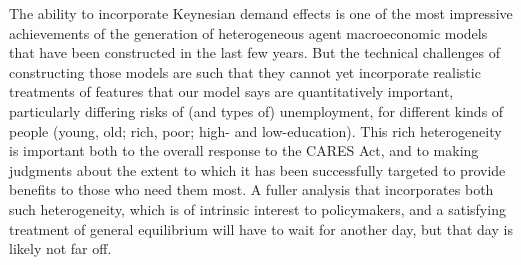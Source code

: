 \documentclass[titlepage,a4paper]{\econtex}
\providecommand{\texname}{ConsumptionResponse}%
\begin{document}
The ability to incorporate Keynesian demand effects is one of the most impressive achievements of the generation of heterogeneous agent macroeconomic models that have been constructed in the last few years.
But the technical challenges of constructing those models are such that they cannot yet incorporate realistic treatments of features that our model says are quantitatively important, particularly differing risks of (and types of) unemployment, for different kinds of people (young, old; rich, poor; high- and low-education).
This rich heterogeneity is important both to the overall response to the CARES Act, and to making judgments about the extent to which it has been successfully targeted to provide benefits to those who need them most.
A fuller analysis that incorporates both such heterogeneity, which is of intrinsic interest to policymakers, and a satisfying treatment of general equilibrium will have to wait for another day, but that day is likely not far off.%

\pagebreak

\small

\normalsize


\pagebreak
\appendix
\setcounter{table}{0}
\renewcommand{\thetable}{A\arabic{table}}

\renewcommand{\onlyinsubfile}[1]{}
\renewcommand{\notinsubfile}[1]{#1}



\end{document}
